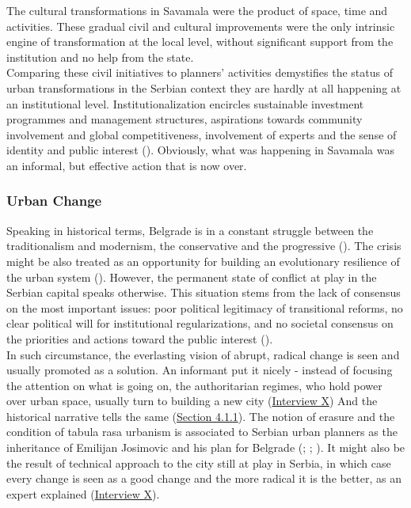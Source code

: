 \documentclass[11pt]{report}
\begin{document}
{The cultural transformations in Savamala were the product of space, time and activities. 
These gradual civil and cultural improvements were the only intrinsic engine of transformation at the local level, without significant support from the institution and no help from the state.
\\

Comparing these civil initiatives to planners' activities demystifies the status of urban transformations in the Serbian context they are hardly at all happening at an institutional level.
Institutionalization encircles sustainable investment programmes and management structures, aspirations towards community involvement and global competitiveness, involvement of experts and the sense of identity and public interest
(\href{Volic}{\cite{VolicEtAl2012}}).
Obviously, what was happening in Savamala was an informal, but effective action that is now over.
    
\subsubsection{Urban Change}

Speaking in historical terms, Belgrade is in a constant struggle between the traditionalism and modernism, the conservative and the progressive (\href{Roter}{\cite{RoterBlagojevic2015}}).
The crisis might be also treated as an opportunity for building an evolutionary resilience of the urban system (\href{Davoudi}{\cite{(Davoudi) from Peric ????}}).
However, the permanent state of conflict at play in the Serbian capital speaks otherwise.
This situation stems from the lack of consensus on the most important issues: poor political legitimacy of transitional reforms, no clear political will for institutional regularizations,  and no societal consensus on the priorities and actions toward the public interest 
(\href{Vujoseivc}{\cite{(VujosevicEtAl.2010}}).
\\

In such circumstance, the everlasting vision of abrupt, radical change is seen and usually promoted as a solution.   
An informant put it nicely - instead of focusing the attention on what is going on, the authoritarian regimes, who hold power over urban space, usually turn to building a new city
(\href{InterviewX}{Interview X})
And the historical narrative tells the same (\href{Section 4.1.1}{Section 4.1.1}).
The notion of erasure and the condition of tabula rasa urbanism is associated to Serbian urban planners as the inheritance of Emilijan Josimovic and his plan for Belgrade (\href{Maksimovic}{\cite{MaksinovicXXXX}}; \href{Perovic}{\cite{PerovicXXXX}}; \href{Blagojevic}{\cite{Blagojevic2009}}).
It might also be the result of technical approach to the city still at play in Serbia, in which case every change is seen as a good change and the more radical it is the better, as an expert explained
(\href{InterviewX}{Interview X}).
\\

}
\end{document}
